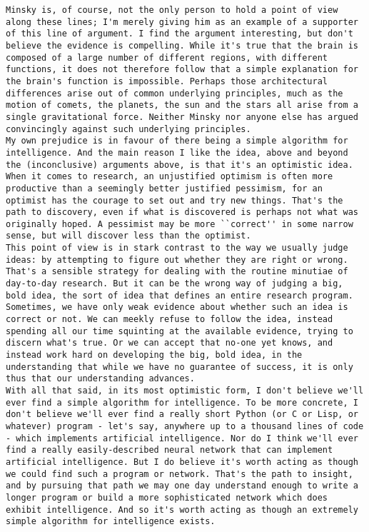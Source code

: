 \begin{lstlisting}
Minsky is, of course, not the only person to hold a point of view along these lines; I'm merely giving him as an example of a supporter of this line of argument. I find the argument interesting, but don't believe the evidence is compelling. While it's true that the brain is composed of a large number of different regions, with different functions, it does not therefore follow that a simple explanation for the brain's function is impossible. Perhaps those architectural differences arise out of common underlying principles, much as the motion of comets, the planets, the sun and the stars all arise from a single gravitational force. Neither Minsky nor anyone else has argued convincingly against such underlying principles.
My own prejudice is in favour of there being a simple algorithm for intelligence. And the main reason I like the idea, above and beyond the (inconclusive) arguments above, is that it's an optimistic idea. When it comes to research, an unjustified optimism is often more productive than a seemingly better justified pessimism, for an optimist has the courage to set out and try new things. That's the path to discovery, even if what is discovered is perhaps not what was originally hoped. A pessimist may be more ``correct'' in some narrow sense, but will discover less than the optimist.
This point of view is in stark contrast to the way we usually judge ideas: by attempting to figure out whether they are right or wrong. That's a sensible strategy for dealing with the routine minutiae of day-to-day research. But it can be the wrong way of judging a big, bold idea, the sort of idea that defines an entire research program. Sometimes, we have only weak evidence about whether such an idea is correct or not. We can meekly refuse to follow the idea, instead spending all our time squinting at the available evidence, trying to discern what's true. Or we can accept that no-one yet knows, and instead work hard on developing the big, bold idea, in the understanding that while we have no guarantee of success, it is only thus that our understanding advances.
With all that said, in its most optimistic form, I don't believe we'll ever find a simple algorithm for intelligence. To be more concrete, I don't believe we'll ever find a really short Python (or C or Lisp, or whatever) program - let's say, anywhere up to a thousand lines of code - which implements artificial intelligence. Nor do I think we'll ever find a really easily-described neural network that can implement artificial intelligence. But I do believe it's worth acting as though we could find such a program or network. That's the path to insight, and by pursuing that path we may one day understand enough to write a longer program or build a more sophisticated network which does exhibit intelligence. And so it's worth acting as though an extremely simple algorithm for intelligence exists.

\end{lstlisting}

